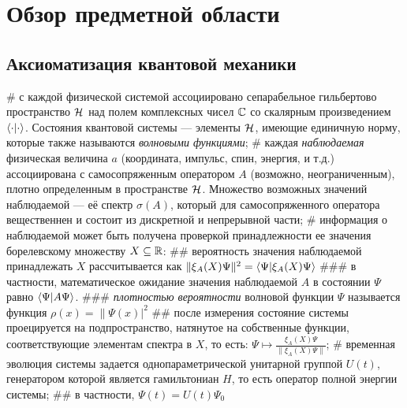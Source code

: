 \chapter{Обзор предметной области}
\label{chapter1}



\section{Аксиоматизация квантовой механики}

\begin{easylist}[itemize]
# с каждой физической системой ассоциировано сепарабельное гильбертово пространство $\mathcal{H}_{}$ над полем комплексных чисел $\mathbb{C}$ со скалярным произведением $\ipcdot$. Состояния квантовой системы — элементы $\mathcal{H}_{}$, имеющие единичную норму, которые также называются \textit{волновыми функциями};
# каждая \textit{наблюдаемая} физическая величина $a$ (координата, импульс, спин, энергия, и т.д.) ассоциирована с самосопряженным оператором $A$ (возможно, неограниченным), плотно определенным в пространстве $\mathcal{H}_{}$. Множество возможных значений наблюдаемой — её спектр $\sigma(A)$, который для самосопряженного оператора вещественнен и состоит из дискретной и непрерывной части;
# информация о наблюдаемой может быть получена проверкой принадлежности ее значения борелевскому множеству $X \subseteq \mathbb{R}$:
## вероятность значения наблюдаемой принадлежать $X$ рассчитывается как $\| \xi_A(X) \Psi \|^2 = \ip{\Psi}{\xi_A(X) \Psi}$
### в частности, математическое ожидание значения наблюдаемой $A$ в состоянии $\Psi$ равно $\ip{\Psi}{A \Psi}$.
### \textit{плотностью вероятности} волновой функции $\Psi$ называется функция $\rho(x) = \|\Psi(x)|^2$ 
## после измерения состояние системы проецируется на подпространство, натянутое на собственные функции, соответствующие элементам спектра в $X$, то есть: $\Psi \mapsto \frac{\xi_A(X) \Psi}{\| \xi_A(X) \Psi \|}$;
# временная эволюция системы задается однопараметрической унитарной группой $U(t)$, генератором которой является гамильтониан $H$, то есть оператор полной энергии системы;
## в частности, $\Psi(t) = U(t) \Psi_0$
\end{easylist}

